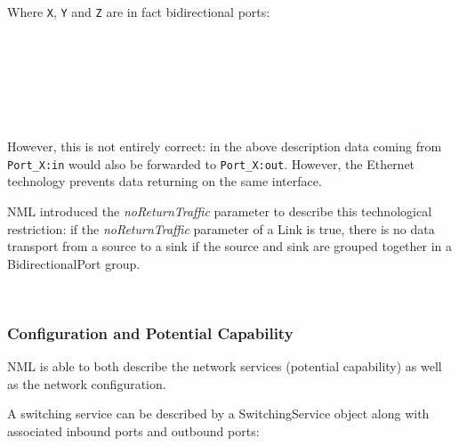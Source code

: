 Where \texttt{X}, \texttt{Y} and \texttt{Z} are in fact bidirectional ports:

 \\
 \\
 \\
 \\
 \\
 \\

However, this is not entirely correct: in the above description data coming from \texttt{Port\_X:in} would also be forwarded to \texttt{Port\_X:out}. However, the Ethernet technology prevents data returning on the same interface.

NML introduced the \emph{noReturnTraffic} parameter to describe this technological restriction: if the \emph{noReturnTraffic} parameter of a Link is true, there is no data transport from a source to a sink if the source and sink are grouped together in a BidirectionalPort group.

 \\


\subsubsection{Configuration and Potential Capability}

NML is able to both describe the network services (potential capability) as well as the network configuration.

A switching service can be described by a SwitchingService object along with associated inbound ports and outbound ports:

 \\
 \\
 \\
 \\

